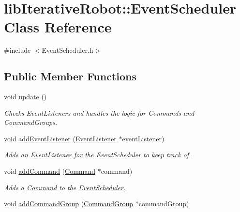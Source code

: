 \hypertarget{classlib_iterative_robot_1_1_event_scheduler}{}\section{lib\+Iterative\+Robot\+::Event\+Scheduler Class Reference}
\label{classlib_iterative_robot_1_1_event_scheduler}


{\ttfamily \#include $<$Event\+Scheduler.\+h$>$}

\subsection*{Public Member Functions}
\begin{DoxyCompactItemize}
\item 
void \mbox{\hyperlink{classlib_iterative_robot_1_1_event_scheduler_a9643c8e8dd7a87a1a3419415c7cc46bc}{update}} ()
\begin{DoxyCompactList}\small\item\em Checks Event\+Listeners and handles the logic for Commands and Command\+Groups. \end{DoxyCompactList}\item 
void \mbox{\hyperlink{classlib_iterative_robot_1_1_event_scheduler_ad6e214ce9686a58eb37fb71796531b4e}{add\+Event\+Listener}} (\mbox{\hyperlink{classlib_iterative_robot_1_1_event_listener}{Event\+Listener}} $\ast$event\+Listener)
\begin{DoxyCompactList}\small\item\em Adds an \mbox{\hyperlink{classlib_iterative_robot_1_1_event_listener}{Event\+Listener}} for the \mbox{\hyperlink{classlib_iterative_robot_1_1_event_scheduler}{Event\+Scheduler}} to keep track of. \end{DoxyCompactList}\item 
void \mbox{\hyperlink{classlib_iterative_robot_1_1_event_scheduler_a7092829578475f88390b7a8c54146299}{add\+Command}} (\mbox{\hyperlink{classlib_iterative_robot_1_1_command}{Command}} $\ast$command)
\begin{DoxyCompactList}\small\item\em Adds a \mbox{\hyperlink{classlib_iterative_robot_1_1_command}{Command}} to the \mbox{\hyperlink{classlib_iterative_robot_1_1_event_scheduler}{Event\+Scheduler}}. \end{DoxyCompactList}\item 
void \mbox{\hyperlink{classlib_iterative_robot_1_1_event_scheduler_a0f4f7e7bace3dfd5156e692b2f68d6df}{add\+Command\+Group}} (\mbox{\hyperlink{classlib_iterative_robot_1_1_command_group}{Command\+Group}} $\ast$command\+Group)

\end{DoxyCompactItemize}
